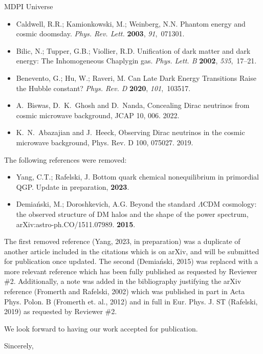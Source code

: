 \documentclass[a4paper, 10pt]{letter}
\begin{document}
\begin{letter}{MDPI Universe}
\begin{itemize}
    \item Caldwell, R.R.; Kamionkowski, M.; Weinberg, N.N. {Phantom energy and cosmic doomsday}. {\em Phys. Rev. Lett.} {\bf 2003}, {\em 91},~071301.
    \item Bilic, N.; Tupper, G.B.; Viollier, R.D. {Unification of dark matter and dark energy: The Inhomogeneous Chaplygin gas}. {\em Phys. Lett. B} {\bf 2002}, {\em 535},~17--21.
    \item Benevento, G.; Hu, W.; Raveri, M. {Can Late Dark Energy Transitions Raise the Hubble constant?} {\em Phys. Rev. D} {\bf 2020}, {\em 101},~103517.
    \item A.~Biswas, D.~K.~Ghosh and D.~Nanda, {Concealing Dirac neutrinos from cosmic microwave background}, JCAP 10, 006. 2022.
    \item K.~N.~Abazajian and J.~Heeck, {Observing Dirac neutrinos in the cosmic microwave background}, Phys. Rev. D 100, 075027. 2019.
\end{itemize}

The following references were removed:
\begin{itemize}
    \item Yang, C.T.; Rafelski, J. {Bottom quark chemical nonequilibrium in primordial QGP}. Update in preparation, {\bf 2023}.
    \item Demia\'nski, M.; Doroshkevich, A.G. {Beyond the standard $\Lambda$CDM cosmology: the observed structure of DM halos and the shape of the power spectrum}, arXiv:astro-ph.CO/1511.07989. {\bf 2015}.
\end{itemize}
The first removed reference (Yang, 2023, in preparation) was a duplicate of another article included in the citations which is on arXiv, and will be submitted for publication once updated. The second (Demia\'nski, 2015) was replaced with a more relevant reference which has been fully published as requested by Reviewer \#2. Additionally, a note was added in the bibliography justifying the arXiv reference (Fromerth and Rafelski, 2002) which was published in part in Acta Phys. Polon. B (Fromerth et. al., 2012) and in full in Eur. Phys. J. ST (Rafelski, 2019) as requested by Reviewer \#2.


We look forward to having our work accepted for publication.

\closing{Sincerely,}

\end{letter}
\end{document}
